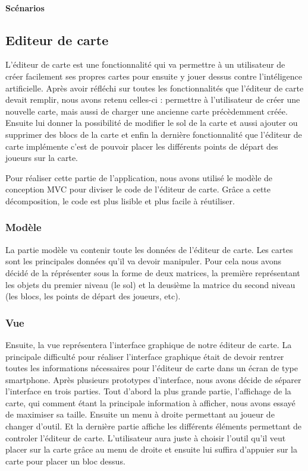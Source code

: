 		
		
						
	\paragraph{Scénarios}
	
	
\subsection{Editeur de carte}	

	L'éditeur de carte est une fonctionnalité qui va permettre à un utilisateur de créer facilement ses propres cartes pour ensuite y jouer dessus contre l'intéligence artificielle. Après avoir réfléchi sur toutes les fonctionnalités que l'éditeur de carte devait remplir, nous avons retenu celles-ci : permettre à l'utilisateur de créer une nouvelle carte, mais aussi de charger une ancienne carte précèdemment créée. Ensuite lui donner la possibilité de modifier le sol de la carte et aussi ajouter ou supprimer des blocs de la carte et enfin la dernière fonctionnalité que l'éditeur de carte implémente c'est de pouvoir placer les différents points de départ des joueurs sur la carte.
		
	Pour réaliser cette partie de l'application, nous avons utilisé le modèle de conception MVC pour diviser le code de l'éditeur de carte. Grâce a cette décomposition, le code est plus lisible et plus facile à réutiliser. 
			
	\subsubsection*{Modèle}
		La partie modèle va contenir toute les données de l'éditeur de carte. Les cartes sont les principales données qu'il va devoir manipuler. Pour cela nous avons décidé de la réprésenter sous la forme de deux matrices, la première représentant les objets du premier niveau (le sol) et la deusième la matrice du second niveau (les blocs, les points de départ des joueurs, etc).
			
			
	\subsubsection*{Vue}
		Ensuite, la vue représentera l'interface graphique de notre éditeur de carte. La principale difficulté pour réaliser l'interface graphique était de devoir rentrer toutes les informations nécessaires pour l'éditeur de carte dans un écran de type \gls{smartphone}. Après plusieurs prototypes d'interface, nous avons décide de séparer l'interface en trois parties. Tout d'abord la plus grande partie, l'affichage de la carte, qui comment étant la principale information à afficher, nous avons essayé de maximiser sa taille. Ensuite un menu à droite permettant au joueur de changer d'outil. Et la dernière partie affiche les différents éléments permettant de controler l'éditeur de carte. L'utilisateur aura juste à choisir l'outil qu'il veut placer sur la carte grâce au menu de droite et ensuite lui suffira d'appuier sur la carte pour placer un bloc dessus.
		
